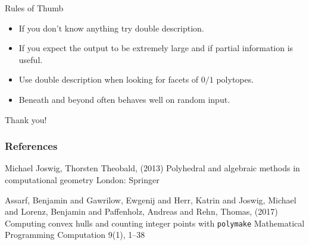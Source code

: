 \documentclass[9pt]{beamer}
\theoremstyle{definition}
\begin{document}

\begin{frame}[fragile]{Rules of Thumb}
  \begin{itemize}
  \item If you don't know anything try double description.
  \item If you expect the output to be extremely large and if partial information is
    useful.
  \item Use double description when looking for facets of $0 / 1$ polytopes.
  \item Beneath and beyond often behaves well on random input.
  \end{itemize}

\end{frame}


\begin{frame}
  \begin{center}
    Thank you!
  \end{center}
\end{frame}

\begin{frame}
  \frametitle{References}
  \footnotesize{
    \begin{thebibliography}{99} %
     Michael Joswig, Thorsten Theobald, (2013)
      \newblock Polyhedral and algebraic methods in computational geometry
      \newblock London: Springer

     Assarf, Benjamin and Gawrilow, Ewgenij and Herr, Katrin and Joswig, Michael and Lorenz, Benjamin and Paffenholz, Andreas and Rehn, Thomas, (2017)
      \newblock Computing convex hulls and counting integer points with \texttt{polymake}
      \newblock Mathematical Programming Computation 9(1), 1--38 



  \end{thebibliography}
  }
\end{frame}

\end{document}
